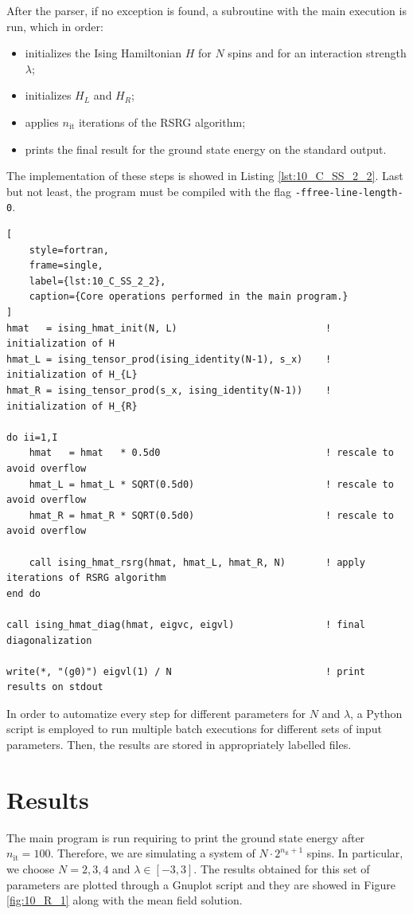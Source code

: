 \documentclass[pra, onecolumn, notitlepage, floats, 11pt]{revtex4-1}
\newcommand{\code}[2][black]{\color{#1}\texttt{#2}}
\begin{document}
After the parser, if no exception is found, a subroutine with the main execution is run, which in order:
\begin{itemize}
    \setlength\itemsep{-3pt}
    \item initializes the Ising Hamiltonian \( H \) for \( N \) spins and for an interaction strength \( \lambda \);
    \item initializes \( H_{L} \) and \( H_{R} \);
    \item applies \( n_{\mathrm{it}} \) iterations of the RSRG algorithm;
    \item prints the final result for the ground state energy on the standard output.
\end{itemize}
The implementation of these steps is showed in Listing \ref{lst:10_C_SS_2_2}. Last but not least, the program must be compiled with the flag \code{-ffree-line-length-0}.

\begin{lstlisting}[
    style=fortran,
    frame=single,
    label={lst:10_C_SS_2_2},
    caption={Core operations performed in the main program.}
]
hmat   = ising_hmat_init(N, L)                          ! initialization of H
hmat_L = ising_tensor_prod(ising_identity(N-1), s_x)    ! initialization of H_{L}
hmat_R = ising_tensor_prod(s_x, ising_identity(N-1))    ! initialization of H_{R}

do ii=1,I
    hmat   = hmat   * 0.5d0                             ! rescale to avoid overflow
    hmat_L = hmat_L * SQRT(0.5d0)                       ! rescale to avoid overflow
    hmat_R = hmat_R * SQRT(0.5d0)                       ! rescale to avoid overflow

    call ising_hmat_rsrg(hmat, hmat_L, hmat_R, N)       ! apply iterations of RSRG algorithm
end do

call ising_hmat_diag(hmat, eigvc, eigvl)                ! final diagonalization

write(*, "(g0)") eigvl(1) / N                           ! print results on stdout
\end{lstlisting}

In order to automatize every step for different parameters for \( N \) and \( \lambda \), a Python script is employed to run multiple batch executions for different sets of input parameters. Then, the results are stored in appropriately labelled files.





\section{Results}
The main program is run requiring to print the ground state energy after \( n_{\mathrm{it}} = 100 \). Therefore, we are simulating a system of \( N \cdot 2^{n_{\mathrm{it}}+1} \) spins. In particular, we choose \( N = 2, 3, 4 \) and \( \lambda \in [-3,3] \).
The results obtained for this set of parameters are plotted through a Gnuplot script and they are showed in Figure \ref{fig:10_R_1} along with the mean field solution.
\end{document}
